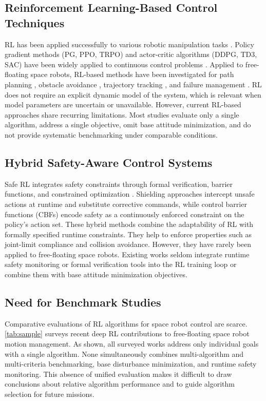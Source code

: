 \documentclass{ieeeaccess}
\begin{document}
\subsection{Reinforcement Learning-Based Control Techniques}
RL has been applied successfully to various robotic manipulation tasks \cite{b2,b7}. Policy gradient
methods (PG, PPO, TRPO) and actor-critic algorithms (DDPG, TD3, SAC) have been widely applied to
continuous control problems \cite{b14,b15,b17,b18,b21}. Applied to free-floating space robots, RL-based
methods have been investigated for path planning \cite{wu2020reinforcement,al2024path}, obstacle
avoidance \cite{huang2023obstacle}, trajectory tracking \cite{hu2025deep}, and failure management
\cite{d2024failure}. RL does not require an explicit dynamic model of the system, which is relevant when
model parameters are uncertain or unavailable. However, current RL-based approaches share recurring
limitations. Most studies evaluate only a single algorithm, address a single objective, omit base
attitude minimization, and do not provide systematic benchmarking under comparable conditions.

\subsection{Hybrid Safety-Aware Control Systems}
Safe RL integrates safety constraints through formal verification,
barrier functions, and constrained optimization \cite{b22,b23,b24,b34}.
Shielding approaches \cite{b23} intercept unsafe actions at runtime and substitute corrective commands,
while control barrier functions (CBFs) \cite{b34} encode safety as a continuously enforced constraint on
the policy's action set.
These hybrid methods combine the adaptability of RL with formally specified runtime constraints. They help to
enforce properties such as joint-limit compliance and collision avoidance. However, they have rarely been applied to
free-floating space robots. Existing works seldom integrate runtime safety monitoring or formal verification tools
into the RL training loop or combine them with base attitude minimization objectives.

\subsection{Need for Benchmark Studies}
Comparative evaluations of RL algorithms for space robot control are scarce. \cref{tab:sample} surveys
recent deep RL contributions to free-floating space robot motion management. As shown, all surveyed works
address only individual goals with a single algorithm. None simultaneously combines multi-algorithm and
multi-criteria benchmarking, base disturbance minimization, and runtime safety monitoring.
This absence of unified evaluation makes it difficult to draw conclusions about relative algorithm
performance and to guide algorithm selection for future missions.
\end{document}
